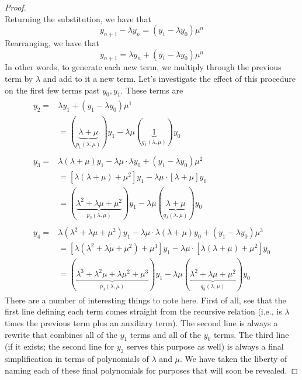 \documentclass[../psets.tex]{subfiles}
\begin{document}
\begin{enumerate}
\begin{enumerate}
\begin{proof}
\begin{equation*}
            \end{equation*}
            Returning the substitution, we have that
            \begin{equation*}
                y_{n+1}-\lambda y_n = (y_1-\lambda y_0)\mu^n
            \end{equation*}
            Rearranging, we have that
            \begin{equation*}
                y_{n+1} = \lambda y_n+(y_1-\lambda y_0)\mu^n
            \end{equation*}
            In other words, to generate each new term, we multiply through the previous term by $\lambda$ and add to it a new term. Let's investigate the effect of this procedure on the first few terms past $y_0,y_1$. These terms are
            \begin{align*}
                \begin{split}
                    y_2 ={}& \lambda y_1+(y_1-\lambda y_0)\mu^1\\
                    &= (\underbrace{\lambda+\mu}_{p_1(\lambda,\mu)})y_1-\lambda\mu(\underbrace{1}_{q_1(\lambda,\mu)})y_0
                \end{split}\\
                \begin{split}
                    y_3 ={}& \lambda(\lambda+\mu)y_1-\lambda\mu\cdot\lambda y_0+(y_1-\lambda y_0)\mu^2\\
                    &= [\lambda(\lambda+\mu)+\mu^2]y_1-\lambda\mu\cdot[\lambda+\mu]y_0\\
                    &= (\underbrace{\lambda^2+\lambda\mu+\mu^2}_{p_2(\lambda,\mu)})y_1-\lambda\mu(\underbrace{\lambda+\mu}_{q_2(\lambda,\mu)})y_0
                \end{split}\\
                \begin{split}
                    y_4 ={}& \lambda(\lambda^2+\lambda\mu+\mu^2)y_1-\lambda\mu\cdot\lambda(\lambda+\mu)y_0+(y_1-\lambda y_0)\mu^3\\
                    &= [\lambda(\lambda^2+\lambda\mu+\mu^2)+\mu^3]y_1-\lambda\mu\cdot[\lambda(\lambda+\mu)+\mu^2]y_0\\
                    &= (\underbrace{\lambda^3+\lambda^2\mu+\lambda\mu^2+\mu^3}_{p_3(\lambda,\mu)})y_1-\lambda\mu(\underbrace{\lambda^2+\lambda\mu+\mu^2}_{q_3(\lambda,\mu)})y_0
                \end{split}
            \end{align*}
            There are a number of interesting things to note here. First of all, see that the first line defining each term comes straight from the recursive relation (i.e., is $\lambda$ times the previous term plus an auxiliary term). The second line is always a rewrite that combines all of the $y_1$ terms and all of the $y_0$ terms. The third line (if it exists; the second line for $y_2$ serves this purpose as well) is always a final simplification in terms of polynomials of $\lambda$ and $\mu$. We have taken the liberty of naming each of these final polynomials for purposes that will soon be revealed.\par

\end{proof}
\end{enumerate}
\end{enumerate}
\end{document}
